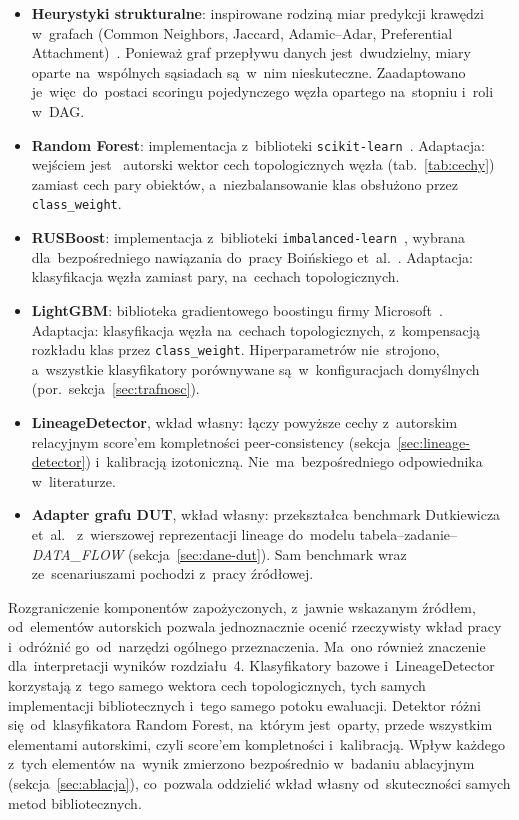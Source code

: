 \begin{itemize}
  \item \textbf{Heurystyki strukturalne}: inspirowane rodziną miar
        predykcji krawędzi w~grafach (Common Neighbors, Jaccard, Adamic–Adar,
        Preferential Attachment)~\cite{LibenNowell2007,Martinez2016}. Ponieważ graf
        przepływu danych jest~dwudzielny, miary oparte na~wspólnych sąsiadach
        są~w~nim nieskuteczne. Zaadaptowano je~więc~do~postaci scoringu
        pojedynczego węzła opartego na~stopniu i~roli w~DAG.
  \item \textbf{Random Forest}: implementacja z~biblioteki
        \texttt{scikit-learn}~\cite{scikit-learn}. Adaptacja: wejściem jest~
        autorski wektor cech topologicznych węzła (tab.~\ref{tab:cechy})
        zamiast cech pary obiektów, a~niezbalansowanie klas obsłużono przez
        \texttt{class\_weight}.
  \item \textbf{RUSBoost}: implementacja z~biblioteki
        \texttt{imbalanced-learn}~\cite{imblearn}, wybrana dla~bezpośredniego
        nawiązania do~pracy Boińskiego et~al.~\cite{Boinski2025}. Adaptacja:
        klasyfikacja węzła zamiast pary, na~cechach topologicznych.
  \item \textbf{LightGBM}: biblioteka gradientowego boostingu
        firmy Microsoft~\cite{Ke2017}. Adaptacja: klasyfikacja
        węzła na~cechach topologicznych, z~kompensacją rozkładu klas przez
        \texttt{class\_weight}. Hiperparametrów nie~strojono, a~wszystkie
        klasyfikatory porównywane są~w~konfiguracjach domyślnych
        (por.~sekcja~\ref{sec:trafnosc}).
  \item \textbf{LineageDetector}, wkład własny: łączy powyższe cechy
        z~autorskim relacyjnym score'em kompletności peer-consistency
        (sekcja~\ref{sec:lineage-detector}) i~kalibracją izotoniczną.
        Nie~ma~bezpośredniego odpowiednika w~literaturze.
  \item \textbf{Adapter grafu DUT}, wkład własny: przekształca benchmark
        Dutkiewicza et~al.~\cite{Dutkiewicz2026} z~wierszowej reprezentacji
        lineage do~modelu tabela–zadanie–\emph{DATA\_FLOW}
        (sekcja~\ref{sec:dane-dut}). Sam benchmark wraz ze~scenariuszami
        pochodzi z~pracy źródłowej.
\end{itemize}

Rozgraniczenie komponentów zapożyczonych, z~jawnie wskazanym źródłem,
od~elementów autorskich pozwala jednoznacznie ocenić rzeczywisty wkład
pracy i~odróżnić go~od~narzędzi ogólnego przeznaczenia. Ma~ono również
znaczenie dla~interpretacji wyników rozdziału~4. Klasyfikatory bazowe
i~LineageDetector korzystają z~tego samego wektora cech topologicznych,
tych samych implementacji bibliotecznych i~tego samego potoku ewaluacji.
Detektor różni się~od~klasyfikatora Random Forest, na~którym jest~oparty,
przede wszystkim elementami autorskimi, czyli score'em kompletności
i~kalibracją. Wpływ każdego z~tych elementów na~wynik zmierzono bezpośrednio
w~badaniu ablacyjnym (sekcja~\ref{sec:ablacja}), co~pozwala oddzielić
wkład własny od~skuteczności samych metod bibliotecznych.
